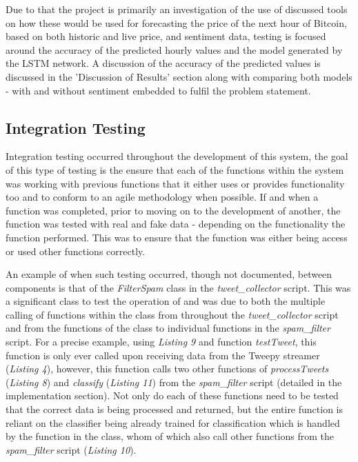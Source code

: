 \documentclass[oneside, 12pt]{article}
\begin{document}
	Due to that the project is primarily an investigation of the use of discussed tools on how these would be used for forecasting the price of the next hour of Bitcoin, based on both historic and live price, and sentiment data, testing is focused around the accuracy of the predicted hourly values and the model generated by the LSTM network. A discussion of the accuracy of the predicted values is discussed in the 'Discussion of Results' section along with comparing both models - with and without sentiment embedded to fulfil the problem statement.
	
	\subsection{Integration Testing}
	Integration testing occurred throughout the development of this system, the goal of this type of testing is the ensure that each of the functions within the system was working with previous functions that it either uses or provides functionality too and to conform to an agile methodology when possible.
	If and when a function was completed, prior to moving on to the development of another, the function was tested with real and fake data - depending on the functionality the function performed. This was to ensure that the function was either being access or used other functions correctly.
	
	An example of when such testing occurred, though not documented, between components is that of the \textit{FilterSpam} class in the \textit{tweet\_collector} script. This was a significant class to test the operation of and was due to both the multiple calling of functions within the class from throughout the \textit{tweet\_collector} script and from the functions of the class to individual functions in the \textit{spam\_filter} script. For a precise example, using \textit{Listing 9} and function \textit{testTweet}, this function is only ever called upon receiving data from the Tweepy streamer (\textit{Listing 4}), however, this function calls two other functions of \textit{processTweets} (\textit{Listing 8}) and \textit{classify} (\textit{Listing 11}) from the \textit{spam\_filter} script (detailed in the implementation section). Not only do each of these functions need to be tested that the correct data is being processed and returned, but the entire function is reliant on the classifier being already trained for classification which is handled by the function in the class, whom of which also call other functions from the \textit{spam\_filter} script (\textit{Listing 10}).
	
\end{document}
